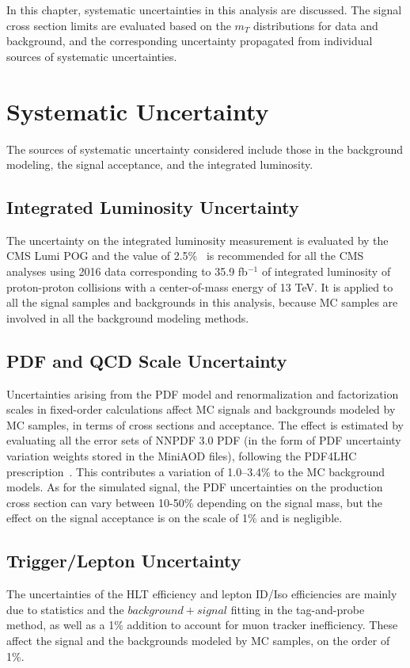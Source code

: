 In this chapter, systematic uncertainties in this analysis are discussed. The signal cross section limits are evaluated based on the $m_T$ distributions for data and background, and the corresponding uncertainty propagated from individual sources of systematic uncertainties.
\section{Systematic Uncertainty}
The sources of systematic uncertainty considered include those in the background modeling, the signal acceptance, and the integrated luminosity.
\subsection{Integrated Luminosity Uncertainty}
The uncertainty on the integrated luminosity measurement is evaluated by the CMS Lumi POG and the value of 2.5\%~\cite{sys_lumi} is recommended for all the CMS analyses using 2016 data corresponding to 35.9 fb$^{-1}$ of integrated luminosity of proton-proton collisions with a center-of-mass energy of 13 TeV. It is applied to all the signal samples and backgrounds in this analysis, because MC samples are involved in all the background modeling methods.
\subsection{PDF and QCD Scale Uncertainty}
Uncertainties arising from the PDF model and renormalization and factorization scales in fixed-order calculations affect MC signals and backgrounds modeled by MC samples, in terms of cross sections and acceptance. The effect is estimated by evaluating all the error sets of NNPDF 3.0 PDF (in the form of PDF uncertainty variation weights stored in the MiniAOD files), following the PDF4LHC prescription~\cite{sample_pdf4lhc}. This contributes a variation of 1.0–3.4\% to the MC background models. As for the simulated signal, the PDF uncertainties on the production cross section can vary between 10-50\% depending on the signal mass, but the effect on the signal acceptance is on the scale of 1\% and is negligible.
\subsection{Trigger/Lepton Uncertainty}
The uncertainties of the HLT efficiency and lepton ID/Iso efficiencies are mainly due to statistics and the $background+signal$ fitting in the tag-and-probe method, as well as a 1\% addition to account for muon tracker inefficiency. These affect the signal and the backgrounds modeled by MC samples, on the order of 1\%. 
